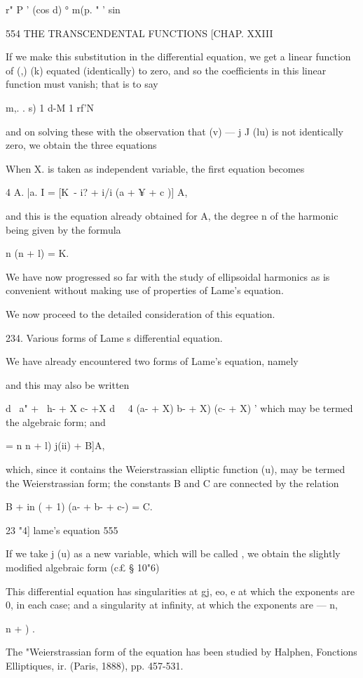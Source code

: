 {{{r" P ' (cos d) ° m(p. " ' sin

554 THE TRANSCENDENTAL FUNCTIONS [CHAP. XXIII

If we make this substitution in the differential equation, we get a
linear function of (,) (k) equated (identically) to zero, and so the
coefficients in this linear function must vanish; that is to say

m,. . s) 1 d-M 1 rf'N

and on solving these with the observation that (v) — j J (lu) is not
identically zero, we obtain the three equations

When X. is taken as independent variable, the first equation becomes

4 A. |a. I = [K\ - i? + i/i (a + ¥ + c )] A,

and this is the equation already obtained for A, the degree n of the
harmonic being given by the formula

n (n + l) = K.

We have now progressed so far with the study of ellipsoidal harmonics
as is convenient without making use of properties of Lame's equation.

We now proceed to the detailed consideration of this equation.

234. Various forms of Lame s differential equation.

We have already encountered two forms of Lame's equation, namely

and this may also be written

d \ a" + \ h- + X c- +X d\ ~ 4 (a- + X) b- + X) (c- + X) ' which may
be termed the algebraic form; and

  = n n + l) j(ii) + B]A,

which, since it contains the Weierstrassian elliptic function (u), may
be termed the Weierstrassian form; the constants B and C are
connected by the relation

B + in ( + 1) (a- + b- + c-) = C.

23 "4] lame's equation 555

If we take j (u) as a new variable, which will be called , we obtain
the slightly modified algebraic form (c£ § 10"6)

This differential equation has singularities at gj, eo, e at which the
exponents are 0, in each case; and a singularity at infinity, at
which the exponents are — n,\ \ {n + ) .

The "Weierstrassian form of the equation has been studied by Halphen,
Fonctions Elliptiques, ir. (Paris, 1888), pp. 457-531.

}}}}

